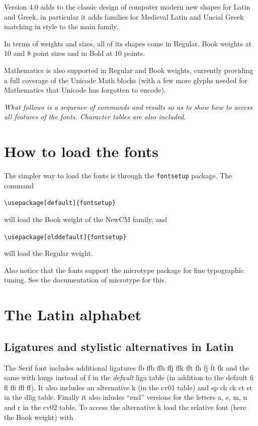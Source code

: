 \documentclass{article}
\begin{document}
Version 4.0 adds to the classic design of computer modern new shapes for Latin and Greek,
in particular it adds families for Medieval Latin and Uncial Greek matching in style to the
main family.

In terms of weights and sizes, all of its shapes come in Regular, Book weights
at 10 and 8 point sizes and in Bold at 10 points.

Mathematics is also supported in Regular and Book weights, currently providing
a full coverage of the Unicode Math blocks (with a few more glyphs needed for Mathematics
that Unicode has forgotten to encode).

\textit{What follows is a sequence of commands and results so as to show how to access all features
of the fonts. Character tables are also included}.

\section{How to load the fonts}
The simpler way to load the fonts is through the \verb|fontsetup| package. The command

\verb|\usepackage[default]{fontsetup}|

\noindent will load the Book weight of the NewCM family, and

\verb|\usepackage[olddefault]{fontsetup}|

\noindent will load the Regular weight.

Also notice that the fonts support the microtype package for fine typographic tuning. See the
documentation of microtype for this.

\section{The Latin alphabet}

\subsection{Ligatures and stylistic alternatives in Latin}
{\newcmaltk
The Serif font includes additional
ligatures fb ffb ffh ffj ffk fft fh fj ft fk and the same with longs instead of f
in the \textit{default} liga table (in addition to the default fi fl ffi ffl ff).
It also includes an alternative k (in the cv01 table) and
{\newcmdlig sp ch ck ct st}
in the dlig table. Finally it also inludes} ``end'' {\newcmaltk versions for the letters
a, e, m, n and r in the cv02 table.
}
To access the alternative k load the relative font (here the Book weight) with
\end{document}
